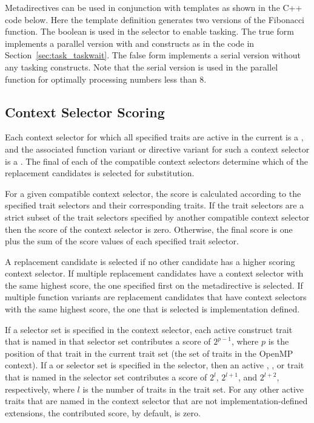 
Metadirectives can be used in conjunction with templates as shown in the C++ code below.
Here the template definition generates two versions of the Fibonacci function.
The  boolean is used in the  selector to enable tasking.
The true form implements a parallel version with  and 
constructs as in the  code in Section~\ref{sec:task_taskwait}. 
The false form implements a serial version without any tasking constructs.
Note that the serial version is used in the parallel function for optimally
processing numbers less than 8.


\subsection{Context Selector Scoring}

\label{subsec:context_selector_scoring}

Each context selector for which all specified traits are active in the current
 is a , and the associated
function variant or directive variant for such a context selector is a
. The final  of each of the compatible
context selectors determine which of the replacement candidates is selected for
substitution. 

For a given compatible context selector, the score is calculated according
to the specified trait selectors and their corresponding traits. If the trait
selectors are a strict subset of the trait selectors specified by another
compatible context selector then the score of the context selector is zero.
Otherwise, the final score is one plus the sum of the score values of each
specified trait selector.

A replacement candidate is selected if no other candidate has a higher scoring
context selector. If multiple replacement candidates have a context selector
with the same highest score, the one specified first on the metadirective is
selected. If multiple function variants are replacement candidates that have
context selectors with the same highest score, the one that is selected is
implementation defined.

If a  selector set is specified in the context selector, each
active construct trait that is named in that selector set contributes a score
of $2^{p-1}$, where $p$ is the position of that trait in the current
 trait set (the set of traits in the OpenMP context). If a
 or  selector set is specified in the
selector, then an active , , or  trait that is
named in the selector set contributes a score of $2^l$, $2^{l+1}$, and
$2^{l+2}$, respectively, where $l$ is the number of traits in the
 trait set. For any other active traits that are named in the
context selector that are not implementation-defined extensions, the
contributed score, by default, is zero. 

